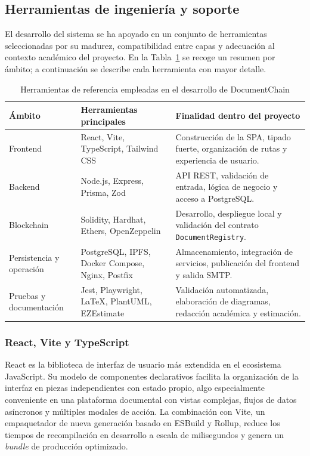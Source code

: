 \documentclass[11pt, a4paper]{article}
\begin{document}
\subsection{Herramientas de ingeniería y soporte}

El desarrollo del sistema se ha apoyado en un conjunto de herramientas seleccionadas por su madurez, compatibilidad entre capas y adecuación al contexto académico del proyecto. En la Tabla~\ref{tab:herramientas-referencia} se recoge un resumen por ámbito; a continuación se describe cada herramienta con mayor detalle.

\begin{table}[H]
    \centering
    \small
    \begin{tabular}{|p{2.8cm}|p{3.6cm}|p{6.6cm}|}
    \hline
    \textbf{Ámbito} & \textbf{Herramientas principales} & \textbf{Finalidad dentro del proyecto} \\
    \hline
    Frontend & React, Vite, TypeScript, Tailwind CSS & Construcción de la SPA, tipado fuerte, organización de rutas y experiencia de usuario. \\
    \hline
    Backend & Node.js, Express, Prisma, Zod & API REST, validación de entrada, lógica de negocio y acceso a PostgreSQL. \\
    \hline
    Blockchain & Solidity, Hardhat, Ethers, OpenZeppelin & Desarrollo, despliegue local y validación del contrato \texttt{DocumentRegistry}. \\
    \hline
    Persistencia y operación & PostgreSQL, IPFS, Docker Compose, Nginx, Postfix & Almacenamiento, integración de servicios, publicación del frontend y salida SMTP. \\
    \hline
    Pruebas y documentación & Jest, Playwright, LaTeX, PlantUML, EZEstimate & Validación automatizada, elaboración de diagramas, redacción académica y estimación. \\
    \hline
    \end{tabular}
    \caption{Herramientas de referencia empleadas en el desarrollo de DocumentChain}
    \label{tab:herramientas-referencia}
\end{table}

\subsubsection{React, Vite y TypeScript}

React es la biblioteca de interfaz de usuario más extendida en el ecosistema JavaScript. Su modelo de componentes declarativos facilita la organización de la interfaz en piezas independientes con estado propio, algo especialmente conveniente en una plataforma documental con vistas complejas, flujos de datos asíncronos y múltiples modales de acción. La combinación con Vite, un empaquetador de nueva generación basado en ESBuild y Rollup, reduce los tiempos de recompilación en desarrollo a escala de milisegundos y genera un \textit{bundle} de producción optimizado.
\end{document}
